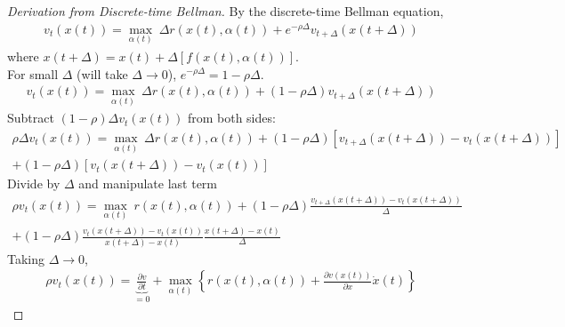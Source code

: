 \documentclass[11pt]{elegantbook}
\begin{document}
\begin{proof}[Derivation from Discrete-time Bellman]
    By the discrete-time Bellman equation,
    \begin{equation}
        \begin{aligned}
            v_t(x(t))=\max_{\alpha(t)}\ \Delta r(x(t),\alpha(t)) + e^{-\rho\Delta}v_{t+\Delta}(x(t+\Delta))
        \end{aligned}
        \nonumber
    \end{equation}
    where $x(t+\Delta)=x(t)+\Delta [f(x(t),\alpha(t))]$.\\
    For small $\Delta$ (will take $\Delta \rightarrow 0$), $e^{-\rho\Delta}=1-\rho\Delta$.
    \begin{equation}
        \begin{aligned}
            v_t(x(t))=\max_{\alpha(t)}\ \Delta r(x(t),\alpha(t)) + (1-\rho\Delta)v_{t+\Delta}(x(t+\Delta))
        \end{aligned}
        \nonumber
    \end{equation}
    Subtract $(1-\rho)\Delta v_t(x(t))$ from both sides:
    \begin{equation}
        \begin{aligned}
            \rho \Delta v_t(x(t))=\max_{\alpha(t)}\ \Delta r(x(t),\alpha(t)) + (1-\rho\Delta)[v_{t+\Delta}(x(t+\Delta))-v_{t}(x(t+\Delta))]\\
            +(1-\rho\Delta)[v_{t}(x(t+\Delta))-v_t(x(t))]
        \end{aligned}
        \nonumber
    \end{equation}
    Divide by $\Delta$ and manipulate last term
    \begin{equation}
        \begin{aligned}
            \rho v_t(x(t))=\max_{\alpha(t)}\ r(x(t),\alpha(t)) + (1-\rho\Delta)\frac{v_{t+\Delta}(x(t+\Delta))-v_t(x(t+\Delta))}{\Delta}\\
            + (1-\rho\Delta)\frac{v_t(x(t+\Delta))-v_t(x(t))}{x(t+\Delta)-x(t)}\frac{x(t+\Delta)-x(t)}{\Delta}
        \end{aligned}
        \nonumber
    \end{equation}
    Taking $\Delta \rightarrow 0$,
    \begin{equation}
        \begin{aligned}
            \rho v_t(x(t)) = \underbrace{\frac{\partial v}{\partial t}}_{=0} + \max_{\alpha(t)}\left\{r(x(t),\alpha(t)) + \frac{\partial v(x(t))}{\partial x}\dot{x}(t)\right\}
        \end{aligned}
        \nonumber
    \end{equation}
\end{proof}
\end{document}
